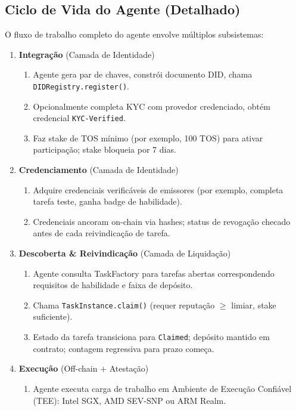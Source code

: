 \documentclass[11pt]{article}
\begin{document}
\subsection{Ciclo de Vida do Agente (Detalhado)}
O fluxo de trabalho completo do agente envolve múltiplos subsistemas:

\begin{enumerate}
  \item \textbf{Integração} (Camada de Identidade)
    \begin{enumerate}[label=\alph*.]
      \item Agente gera par de chaves, constrói documento DID, chama \texttt{DIDRegistry.register()}.
      \item Opcionalmente completa KYC com provedor credenciado, obtém credencial \texttt{KYC-Verified}.
      \item Faz stake de TOS mínimo (por exemplo, 100 TOS) para ativar participação; stake bloqueia por 7 dias.
    \end{enumerate}
  \item \textbf{Credenciamento} (Camada de Identidade)
    \begin{enumerate}[label=\alph*.]
      \item Adquire credenciais verificáveis de emissores (por exemplo, completa tarefa teste, ganha badge de habilidade).
      \item Credenciais ancoram on-chain via hashes; status de revogação checado antes de cada reivindicação de tarefa.
    \end{enumerate}
  \item \textbf{Descoberta \& Reivindicação} (Camada de Liquidação)
    \begin{enumerate}[label=\alph*.]
      \item Agente consulta TaskFactory para tarefas abertas correspondendo requisitos de habilidade e faixa de depósito.
      \item Chama \texttt{TaskInstance.claim()} (requer reputação $\geq$ limiar, stake suficiente).
      \item Estado da tarefa transiciona para \texttt{Claimed}; depósito mantido em contrato; contagem regressiva para prazo começa.
    \end{enumerate}
  \item \textbf{Execução} (Off-chain + Atestação)
    \begin{enumerate}[label=\alph*.]
      \item Agente executa carga de trabalho em Ambiente de Execução Confiável (TEE): Intel SGX, AMD SEV-SNP ou ARM Realm.

\end{enumerate}
\end{enumerate}
\end{document}
